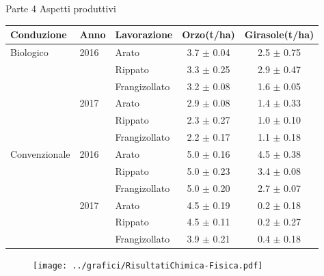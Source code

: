 \documentclass[10pt]{beamer}
\begin{document}
\begin{frame}{Parte 4 \small{Aspetti produttivi}}

  \vspace{0.5cm}
  \footnotesize{
    \begin{table}[ht]
      \centering
      \begin{tabular}{lllcc}
        \hline
        Conduzione   & Anno & Lavorazione   & Orzo(t/ha)      & Girasole(t/ha) \\ 
        \hline
        Biologico    & 2016 & Arato         & 3.7 $\pm$ 0.04  & 2.5 $\pm$ 0.75 \\ 
                     &      & Rippato       & 3.3 $\pm$ 0.25  & 2.9 $\pm$ 0.47 \\ 
                     &      & Frangizollato & 3.2 $\pm$ 0.08  & 1.6 $\pm$ 0.05 \\ 
                     & 2017 & Arato         & 2.9 $\pm$ 0.08  & 1.4 $\pm$ 0.33 \\ 
                     &      & Rippato       & 2.3 $\pm$ 0.27  & 1.0 $\pm$ 0.10 \\ 
                     &      & Frangizollato & 2.2 $\pm$ 0.17  & 1.1 $\pm$ 0.18 \\ 
        Convenzionale& 2016 & Arato         & 5.0 $\pm$ 0.16  & 4.5 $\pm$ 0.38 \\ 
                     &      & Rippato       & 5.0 $\pm$ 0.23  & 3.4 $\pm$ 0.08 \\ 
                     &      & Frangizollato & 5.0 $\pm$ 0.20  & 2.7 $\pm$ 0.07 \\ 
                     & 2017 & Arato         & 4.5 $\pm$ 0.19  & 0.2 $\pm$ 0.18 \\ 
                     &      & Rippato       & 4.5 $\pm$ 0.11  & 0.2 $\pm$ 0.27 \\ 
                     &      & Frangizollato & 3.9 $\pm$ 0.21  & 0.4 $\pm$ 0.18 \\ 
        \hline
      \end{tabular}
    \end{table}}



\end{frame}



\begin{frame}
\end{frame}

\appendix

\begin{frame}
\vspace{1.5cm}
\begin{figure}
\centering
\texttt{[image: ../grafici/RisultatiChimica-Fisica.pdf]}
\end{figure}
\end{frame}
\end{document}
